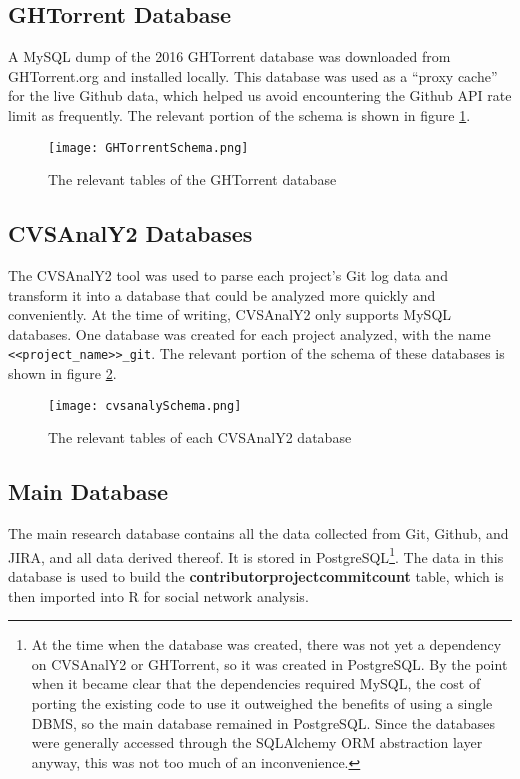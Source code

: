 \subsection{GHTorrent Database}
A MySQL dump of the 2016 GHTorrent database was downloaded from GHTorrent.org and installed locally. This database was used as a ``proxy cache'' for the live Github data, which helped us avoid encountering the Github API rate limit as frequently. The relevant portion of the schema is shown in figure \ref{fig:ghtorrentSchema}.
\begin{figure}
	\texttt{[image: GHTorrentSchema.png]}
	\centering
	\caption{The relevant tables of the GHTorrent database}
	\label{fig:ghtorrentSchema}
\end{figure}
\subsection{CVSAnalY2 Databases}
The CVSAnalY2 tool\cite{cvsanaly} was used to parse each project's Git log data and transform it into a database that could be analyzed more quickly and conveniently. At the time of writing, CVSAnalY2 only supports MySQL databases. One database was created for each project analyzed, with the name \verb|<<project_name>>_git|. The relevant portion of the schema of these databases is shown in figure \ref{fig:cvsanalySchema}.
\begin{figure}
	\texttt{[image: cvsanalySchema.png]}
	\centering
	\caption{The relevant tables of each CVSAnalY2 database}
	\label{fig:cvsanalySchema}
\end{figure}
\subsection{Main Database}
The main research database contains all the data collected from Git, Github, and JIRA, and all data derived thereof. It is stored in PostgreSQL\footnote{At the time when the database was created, there was not yet a dependency on CVSAnalY2 or GHTorrent, so it was created in PostgreSQL. By the point when it became clear that the dependencies required MySQL, the cost of porting the existing code to use it outweighed the benefits of using a single DBMS, so the main database remained in PostgreSQL. Since the databases were generally accessed through the SQLAlchemy ORM abstraction layer anyway, this was not too much of an inconvenience.}. The data in this database is used to build the \textbf{contributorprojectcommitcount} table, which is then imported into R for social network analysis.

